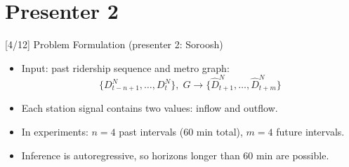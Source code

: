 \documentclass[aspectratio=169]{beamer}
\begin{document}
\section{Presenter 2}

\begin{frame}{[4/12] Problem Formulation (presenter 2: Soroosh)}
\hypertarget{sec:architecture}{}
  \begin{itemize}
    \item Input: past ridership sequence and metro graph:
    \[
      \{D^N_{t-n+1}, \dots, D^N_t\},\; G
      \rightarrow
      \{\hat{D}^N_{t+1}, \dots, \hat{D}^N_{t+m}\}
    \]
    \item Each station signal contains two values: inflow and outflow.
    \item In experiments: \(n=4\) past intervals (60 min total), \(m=4\) future intervals.
    \item Inference is autoregressive, so horizons longer than 60 min are possible.
  \end{itemize}
\end{frame}
\end{document}
